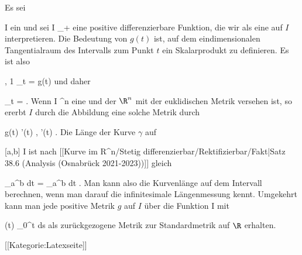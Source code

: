 {

Es sei

\mavergleichskette
{\vergleichskette
{ I
}
{ \subseteq }{ \R
}
{  }{
}
{    }{
}
{   }{
}
}
{}{}{}
ein
und sei
 { I } {\R_+
} {}
eine positive differenzierbare Funktion, die wir als eine
auf $I$ interpretieren. Die Bedeutung von $g(t)$ ist, auf dem eindimensionalen Tangentialraum des Intervalls zum Punkt $t$ ein Skalarprodukt zu definieren. Es ist also

\mavergleichskettedisp
{\vergleichskette
{ \left{}  ,  1  \right\rangle_t
}
{ =} { g(t)
}
{ } {
}
{ } {
}
{ } {
}
}
{}{}{}
und daher

\mavergleichskettedisp
{\vergleichskette
{  \Vert_t
}
{ =} { 
}
{ } {
}
{ } {
}
{ } {
}
}
{}{}{.}
Wenn
\maabb {\gamma} { I } { \R^n
} {}
eine
und der $\R^n$ mit der euklidischen Metrik versehen ist, so ererbt $I$ durch die Abbildung eine solche Metrik durch

\mavergleichskettedisp
{\vergleichskette
{ g(t)
}
{ } { \left\langle  \gamma'(t) ,  \gamma'(t)  \right\rangle
}
{ } {
}
{ } {
}
{ } {
}
}
{}{}{.}
Die Länge der Kurve $\gamma$ auf

\mavergleichskette
{\vergleichskette
{ [a,b]
}
{ \subseteq }{ I
}
{  }{
}
{    }{
}
{   }{
}
}
{}{}{}
ist nach
[[Kurve im R^n/Stetig differenzierbar/Rektifizierbar/Fakt|Satz 38.6 (Analysis (Osnabrück 2021-2023))]]
gleich

\mavergleichskettedisp
{\vergleichskette
{ \int_a^b  \Vert  dt
}
{ =} { \int_a^b    dt
}
{ } {
}
{ } {
}
{ } {
}
}
{}{}{.}
Man kann also die Kurvenlänge auf dem Intervall berechnen, wenn man darauf die infinitesimale Längenmessung kennt. Umgekehrt kann man jede positive Metrik $g$ auf $I$ über die Funktion
\maabbdisp {\gamma} { I } { \R
} {}
mit

\mavergleichskettedisp
{\vergleichskette
{ \gamma(t)
}
{ } { \int_0^t  ds
}
{ } {
}
{ } {
}
{ } {
}
}
{}{}{}
als zurückgezogene Metrik zur Standardmetrik auf $\R$ erhalten.

}

 [[Kategorie:Latexseite]]

